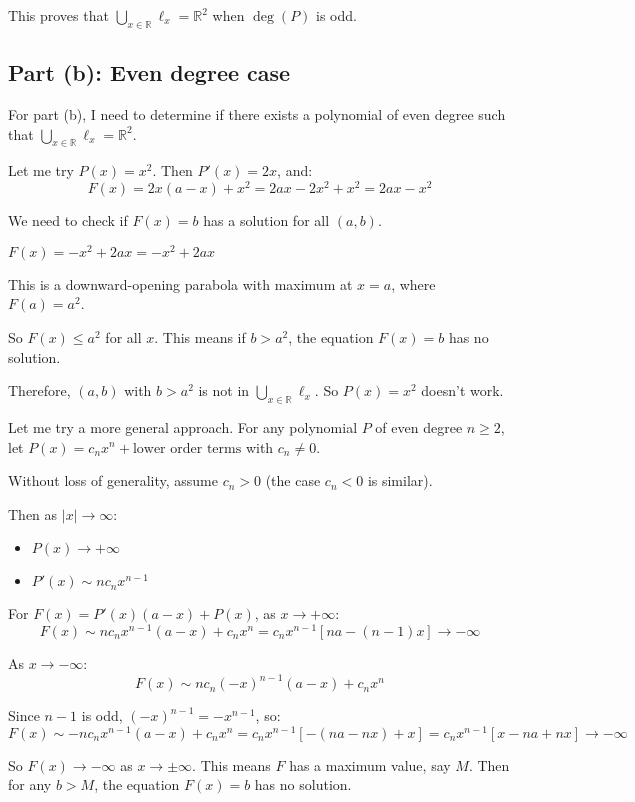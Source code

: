 \documentclass[12pt,a4paper]{article}
\theoremstyle{definition}
\begin{document}
    This proves that $\bigcup_{x \in \mathbb{R}} \ell_x = \mathbb{R}^2$ when $\deg(P)$ is odd.

    \subsection*{Part (b): Even degree case}

    For part (b), I need to determine if there exists a polynomial of even degree such that $\bigcup_{x \in \mathbb{R}} \ell_x = \mathbb{R}^2$.

    Let me try $P(x) = x^2$. Then $P'(x) = 2x$, and:
    $$F(x) = 2x(a - x) + x^2 = 2ax - 2x^2 + x^2 = 2ax - x^2$$

    We need to check if $F(x) = b$ has a solution for all $(a, b)$.

    $F(x) = -x^2 + 2ax = -x^2 + 2ax$

    This is a downward-opening parabola with maximum at $x = a$, where $F(a) = a^2$.

    So $F(x) \leq a^2$ for all $x$. This means if $b > a^2$, the equation $F(x) = b$ has no solution.

    Therefore, $(a, b)$ with $b > a^2$ is not in $\bigcup_{x \in \mathbb{R}} \ell_x$. So $P(x) = x^2$ doesn't work.

    Let me try a more general approach. For any polynomial $P$ of even degree $n \geq 2$, let $P(x) = c_nx^n + \text{lower order terms}$ with $c_n \neq 0$.

    Without loss of generality, assume $c_n > 0$ (the case $c_n < 0$ is similar).

    Then as $|x| \to \infty$:
    \begin{itemize}
        \item $P(x) \to +\infty$
        \item $P'(x) \sim nc_nx^{n-1}$
    \end{itemize}

    For $F(x) = P'(x)(a - x) + P(x)$, as $x \to +\infty$:
    $$F(x) \sim nc_nx^{n-1}(a - x) + c_nx^n = c_nx^{n-1}[na - (n-1)x] \to -\infty$$

    As $x \to -\infty$:
    $$F(x) \sim nc_n(-x)^{n-1}(a - x) + c_nx^n$$

    Since $n-1$ is odd, $(-x)^{n-1} = -x^{n-1}$, so:
    $$F(x) \sim -nc_nx^{n-1}(a - x) + c_nx^n = c_nx^{n-1}[-(na - nx) + x] = c_nx^{n-1}[x - na + nx] \to -\infty$$

    So $F(x) \to -\infty$ as $x \to \pm\infty$. This means $F$ has a maximum value, say $M$. Then for any $b > M$, the equation $F(x) = b$ has no solution.
\end{document}
